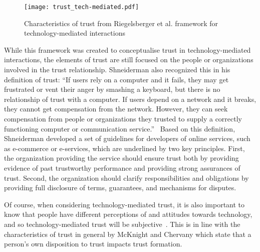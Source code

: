 \documentclass{article}
\newcommand{\brendan}[1]{\textcolor{blue}{}}
\begin{document}
\begin{figure}
    \centering
    \texttt{[image: trust\_tech-mediated.pdf]}
    \caption{Characteristics of trust from Riegelsberger et al. framework for technology-mediated interactions~\cite{riegelsberger2005mechanics} }
    \label{fig:riegelsberger}
\end{figure}

While this framework was created to conceptualise trust in technology-mediated interactions, the elements of trust are still focused on the people or organizations involved in the trust relationship. Shneiderman also recognized this in his definition of trust: ``If users rely on a computer and it fails, they may get frustrated or vent their anger by smashing a keyboard, but there is no relationship of trust with a computer. If users depend on a network and it breaks, they cannot get compensation from the network. However, they can seek compensation from people or organizations they trusted to supply a correctly functioning computer or communication service.''~\cite{shneiderman2000designing} Based on this definition, Shneiderman developed a set of guidelines for  developers of online services, such as e-commerce or e-services, which are underlined by two key principles. First, the organization providing the service should ensure trust both by providing evidence of past trustworthy performance and providing strong assurances of trust. Second, the organization should clarify responsibilities and obligations by providing full disclosure of terms, guarantees, and mechanisms for disputes. 

\brendan{This is quite mechanistic - I wonder what a biological living set of guidelines would look like...natural law? It'd be good to get Richman's view on this.}

Of course, when considering technology-mediated trust, it is also important to know that people have different perceptions of and attitudes towards technology, and so technology-mediated trust will be subjective~\cite{grabner2002role}. This is in line with the characteristics of trust in general by McKnight and Chervany which state that a person's own disposition to trust impacts trust formation.
\end{document}
